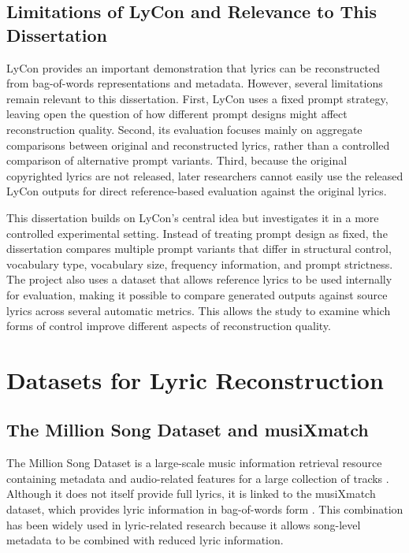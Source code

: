 \subsection{Limitations of LyCon and Relevance to This Dissertation}

LyCon provides an important demonstration that lyrics can be reconstructed from bag-of-words representations and metadata. However, several limitations remain relevant to this dissertation. First, LyCon uses a fixed prompt strategy, leaving open the question of how different prompt designs might affect reconstruction quality. Second, its evaluation focuses mainly on aggregate comparisons between original and reconstructed lyrics, rather than a controlled comparison of alternative prompt variants. Third, because the original copyrighted lyrics are not released, later researchers cannot easily use the released LyCon outputs for direct reference-based evaluation against the original lyrics.

This dissertation builds on LyCon's central idea but investigates it in a more controlled experimental setting. Instead of treating prompt design as fixed, the dissertation compares multiple prompt variants that differ in structural control, vocabulary type, vocabulary size, frequency information, and prompt strictness. The project also uses a dataset that allows reference lyrics to be used internally for evaluation, making it possible to compare generated outputs against source lyrics across several automatic metrics. This allows the study to examine which forms of control improve different aspects of reconstruction quality.

\section{Datasets for Lyric Reconstruction}

\subsection{The Million Song Dataset and musiXmatch}

The Million Song Dataset is a large-scale music information retrieval resource containing metadata and audio-related features for a large collection of tracks \cite{bertinmahieux2011million}. Although it does not itself provide full lyrics, it is linked to the musiXmatch dataset, which provides lyric information in bag-of-words form \cite{musixmatch2011dataset}. This combination has been widely used in lyric-related research because it allows song-level metadata to be combined with reduced lyric information.

